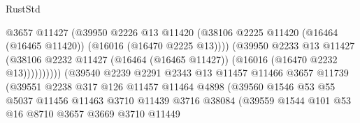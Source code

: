 \begin{lexlean}{RustStd}
\begin{coremodule}
                                          @3657
                                          @11427
                                          (@39950
                                            @2226
                                            @13
                                            @11420
                                            (@38106
                                              @2225
                                              @11420
                                              (@16464 (@16465 @11420))
                                              (@16016 (@16470 @2225 @13))))
                                          (@39950
                                            @2233
                                            @13
                                            @11427
                                            (@38106
                                              @2232
                                              @11427
                                              (@16464 (@16465 @11427))
                                              (@16016 (@16470 @2232 @13))))))))))
                              (@39540
                                @2239
                                @2291
                                @2343
                                @13
                                @11457
                                @11466
                                @3657
                                @11739
                                (@39551
                                  @2238
                                  @317
                                  @126
                                  @11457
                                  @11464
                                  @4898
                                  (@39560
                                    @1546
                                    @53
                                    @55
                                    @5037
                                    @11456
                                    @11463
                                    @3710
                                    @11439
                                    @3716
                                    @38084
                                    (@39559
                                      @1544
                                      @101
                                      @53
                                      @16
                                      @8710
                                      @3657
                                      @3669
                                      @3710
                                      @11449

\end{coremodule}
\end{lexlean}
